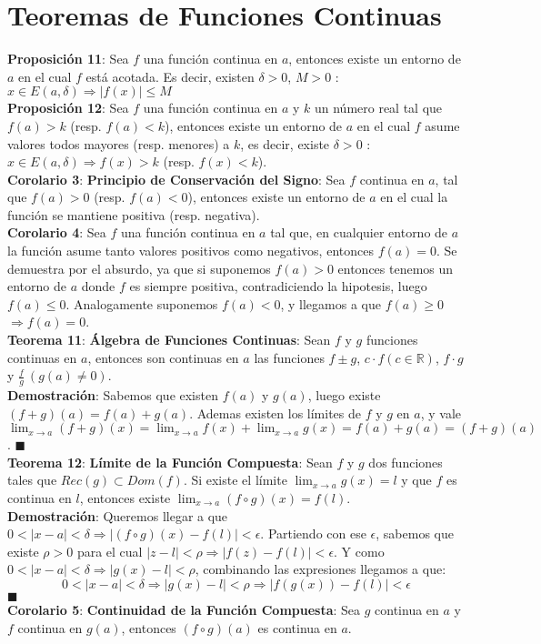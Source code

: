 \documentclass[11pt,a4paper]{article}
\newcommand*{\QEDA}{\null\nobreak\hfill\ensuremath{\blacksquare}}
\begin{document}
\section{Teoremas de Funciones Continuas}
\textbf{Proposici\'on 11}: Sea $f$ una funci\'on continua en $a$, entonces existe un entorno de $a$ en el cual $f$ est\'a acotada. Es decir, existen $\delta > 0$, $M > 0$ : $x \in E(a, \delta) \Rightarrow |f(x)| \leq M$\\
\noindent \textbf{Proposici\'on 12}: Sea $f$ una funci\'on continua en $a$ y $k$ un n\'umero real tal que $f(a) > k$ (resp. $f(a) < k$), entonces existe un entorno de $a$ en el cual $f$ asume valores todos mayores (resp. menores) a $k$, es decir, existe $\delta > 0$ : $x \in E(a,\delta) \Rightarrow f(x) > k$ (resp. $f(x) < k$).\\
\noindent \textbf{Corolario 3}: \textbf{Principio de Conservaci\'on del Signo}: Sea $f$ continua en $a$, tal que $f(a)>0$ (resp. $f(a)<0$), entonces existe un entorno de $a$ en el cual la funci\'on se mantiene positiva (resp. negativa).\\
\noindent \textbf{Corolario 4}: Sea $f$ una funci\'on continua en $a$ tal que, en cualquier entorno de $a$ la funci\'on asume tanto valores positivos como negativos, entonces $f(a)=0$. Se demuestra por el absurdo, ya que si suponemos $f(a)>0$ entonces tenemos un entorno de $a$ donde $f$ es siempre positiva, contradiciendo la hipotesis, luego $f(a)\leq 0$. Analogamente suponemos $f(a)<0$, y llegamos a que $f(a)\geq 0$ $\Rightarrow f(a)=0$.\\

\noindent \textbf{Teorema 11}: \textbf{\'Algebra de Funciones Continuas}: Sean $f$ y $g$ funciones continuas en $a$, entonces son continuas en $a$ las funciones $f \pm g$, $c \cdot f (c \in \mathbb{R})$, $f \cdot g$ y $\frac{f}{g}\ (g(a) \not = 0)$.\\
\noindent \textbf{Demostraci\'on}: Sabemos que existen $f(a)$ y $g(a)$, luego existe $(f+g)(a) = f(a) + g(a)$. Ademas existen los l\'imites de $f$ y $g$ en $a$, y vale $\displaystyle{\lim_{x \to a} (f+g)(x) = \lim_{x \to a} f(x) + \lim_{x \to a} g(x) = f(a) + g(a) = (f+g)(a)}$. \QEDA\\
\noindent \textbf{Teorema 12}: \textbf{L\'imite de la Funci\'on Compuesta}: Sean $f$ y $g$ dos funciones tales que $Rec(g) \subset Dom(f)$. Si existe el l\'imite $\displaystyle{\lim_{x \to a} g(x) = l}$ y que $f$ es continua en $l$, entonces existe $\displaystyle{\lim_{x \to a} (f\circ g)(x) = f(l)}$.\\
\textbf{Demostraci\'on}: Queremos llegar a que $0<|x-a|<\delta \Rightarrow |(f \circ g)(x) - f(l)| < \epsilon$. Partiendo con ese $\epsilon$, sabemos que existe $\rho > 0$ para el cual $|z-l| < \rho \Rightarrow |f(z)-f(l)| < \epsilon$. Y como $0 < |x-a| < \delta \Rightarrow |g(x) - l| < \rho$, combinando las expresiones llegamos a que: $$0 < |x-a| < \delta \Rightarrow |g(x)-l| < \rho \Rightarrow |f(g(x)) - f(l)| < \epsilon $$ \QEDA\\
\noindent \textbf{Corolario 5}: \textbf{Continuidad de la Funci\'on Compuesta}: Sea $g$ continua en $a$ y $f$ continua en $g(a)$, entonces $(f\circ g)(a)$ es continua en $a$.
\end{document}
